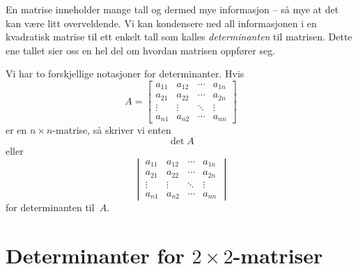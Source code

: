 

\label{ch:determinanter}

En matrise inneholder mange tall og dermed mye informasjon -- så mye
at det kan være litt overveldende.  Vi kan kondensere ned all
informasjonen i en kvadratisk matrise til ett enkelt tall som kalles
\emph{determinanten} til matrisen.  Dette ene tallet sier oss en hel
del om hvordan matrisen oppfører seg.

Vi har to forskjellige notasjoner for determinanter.
Hvis
\[
A =
\begin{bmatrix}
a_{11} & a_{12} & \cdots & a_{1n} \\
a_{21} & a_{22} & \cdots & a_{2n} \\
\vdots & \vdots & \ddots & \vdots \\
a_{n1} & a_{n2} & \cdots & a_{nn}
\end{bmatrix}
\]
er en $n \times n$-matrise, så skriver vi enten
\[
\det A
\]
eller
\[
\begin{vmatrix}
a_{11} & a_{12} & \cdots & a_{1n} \\
a_{21} & a_{22} & \cdots & a_{2n} \\
\vdots & \vdots & \ddots & \vdots \\
a_{n1} & a_{n2} & \cdots & a_{nn}
\end{vmatrix}
\]
for determinanten til~$A$.%



\section*{Determinanter for $2 \times 2$-matriser}

